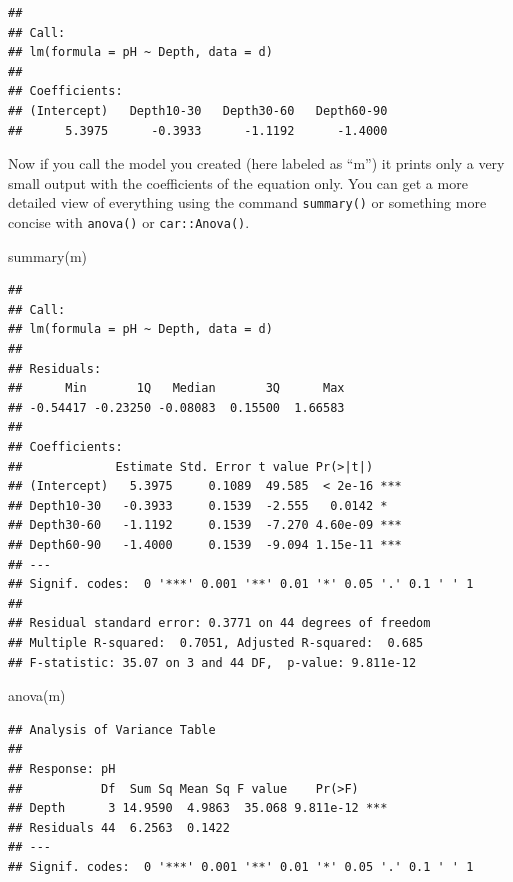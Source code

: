 \documentclass[
]{book}
\newenvironment{Shaded}{\begin{snugshade}}{\end{snugshade}}
\newcommand{\FunctionTok}[1]{\textcolor[rgb]{0.00,0.00,0.00}{#1}}
\newcommand{\NormalTok}[1]{#1}
\begin{document}
\begin{verbatim}
## 
## Call:
## lm(formula = pH ~ Depth, data = d)
## 
## Coefficients:
## (Intercept)   Depth10-30   Depth30-60   Depth60-90  
##      5.3975      -0.3933      -1.1192      -1.4000
\end{verbatim}

Now if you call the model you created (here labeled as ``m'') it prints only a very small output with the coefficients of the equation only. You can get a more detailed view of everything using the command \texttt{summary()} or something more concise with \texttt{anova()} or \texttt{car::Anova()}.

\begin{Shaded}
\begin{Highlighting}[]
\FunctionTok{summary}\NormalTok{(m)}
\end{Highlighting}
\end{Shaded}

\begin{verbatim}
## 
## Call:
## lm(formula = pH ~ Depth, data = d)
## 
## Residuals:
##      Min       1Q   Median       3Q      Max 
## -0.54417 -0.23250 -0.08083  0.15500  1.66583 
## 
## Coefficients:
##             Estimate Std. Error t value Pr(>|t|)    
## (Intercept)   5.3975     0.1089  49.585  < 2e-16 ***
## Depth10-30   -0.3933     0.1539  -2.555   0.0142 *  
## Depth30-60   -1.1192     0.1539  -7.270 4.60e-09 ***
## Depth60-90   -1.4000     0.1539  -9.094 1.15e-11 ***
## ---
## Signif. codes:  0 '***' 0.001 '**' 0.01 '*' 0.05 '.' 0.1 ' ' 1
## 
## Residual standard error: 0.3771 on 44 degrees of freedom
## Multiple R-squared:  0.7051, Adjusted R-squared:  0.685 
## F-statistic: 35.07 on 3 and 44 DF,  p-value: 9.811e-12
\end{verbatim}

\begin{Shaded}
\begin{Highlighting}[]
\FunctionTok{anova}\NormalTok{(m)}
\end{Highlighting}
\end{Shaded}

\begin{verbatim}
## Analysis of Variance Table
## 
## Response: pH
##           Df  Sum Sq Mean Sq F value    Pr(>F)    
## Depth      3 14.9590  4.9863  35.068 9.811e-12 ***
## Residuals 44  6.2563  0.1422                      
## ---
## Signif. codes:  0 '***' 0.001 '**' 0.01 '*' 0.05 '.' 0.1 ' ' 1
\end{verbatim}
\end{document}

